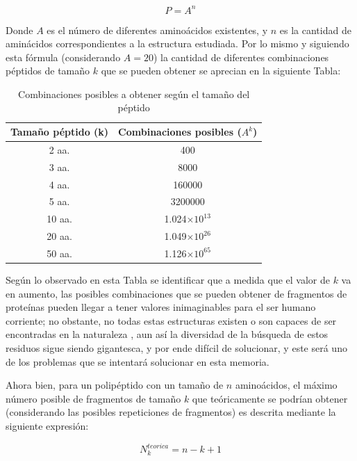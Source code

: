 \begin{equation}
P=A^{n}
\end{equation}

Donde $A$ es el número de diferentes aminoácidos existentes, y $n$ es la cantidad de aminácidos correspondientes a la estructura estudiada. Por lo mismo y siguiendo esta fórmula (considerando $A=20$) la cantidad de diferentes combinaciones péptidos de tamaño $k$ que se pueden obtener se aprecian en la siguiente Tabla:

\begin{table}[H]
\centering
\label{my-label2}
\begin{tabular}{|c|c|}
\hline
Tamaño péptido (k) & \multicolumn{1}{c|}{Combinaciones posibles ($A^{k}$)}  \\ \hline
2 aa.     & 400        \\
3 aa.     & 8000                         \\
4 aa.      &      160000                             \\
5 aa.      &   3200000       \\
10 aa.      &   1.024$\times 10^{13}$       \\
20 aa.      &   1.049$\times 10^{26}$       \\
50 aa.   &     1.126$\times 10^{65}$   \\ \hline
\end{tabular}
\caption{Combinaciones posibles a obtener según el tamaño del péptido}
\end{table}

Según lo observado en esta Tabla se identificar que a medida que el valor de $k$ va en aumento, las posibles combinaciones que se pueden obtener de fragmentos de proteínas pueden llegar a tener valores inimaginables para el ser humano corriente; no obstante, no todas estas estructuras existen o son capaces de ser encontradas en la naturaleza \cite{array}, aun así la diversidad de la búsqueda de estos residuos sigue siendo gigantesca, y por ende difícil de solucionar, y este será uno de los problemas que se intentará solucionar en esta memoria.

Ahora bien, para un polipéptido con un tamaño de $n$ aminoácidos, el máximo número posible de fragmentos de tamaño $k$ que teóricamente se podrían obtener (considerando las posibles repeticiones de fragmentos) es descrita mediante la siguiente expresión:

\begin{equation}
N_{k}^{teorica}=n-k+1
\end{equation}

